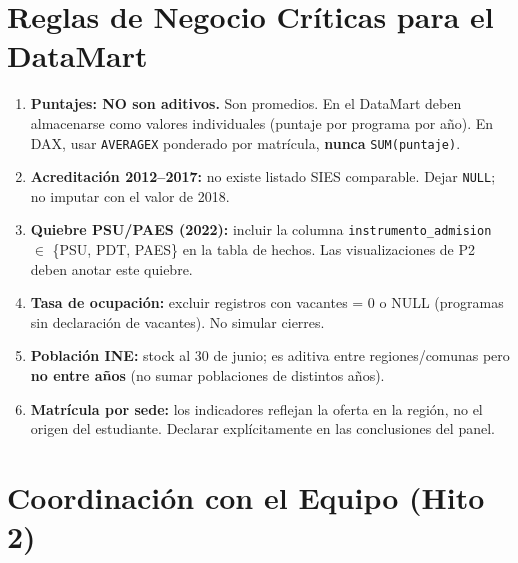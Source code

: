 \documentclass[11pt,a4paper]{article}
\begin{document}
\section{Reglas de Negocio Críticas para el DataMart}
\label{sec:reglas}

\begin{tcolorbox}[colback=white, colframe=warnred,
    title=\textbf{\color{warnred}Advertencias de Integración (Persona 2 $\to$ Personas 3, 4 y 5)}]
\begin{enumerate}[leftmargin=*]
    \item \textbf{Puntajes: NO son aditivos.} Son promedios. En el DataMart
          deben almacenarse como valores individuales (puntaje por programa
          por año). En DAX, usar \texttt{AVERAGEX} ponderado por matrícula,
          \textbf{nunca} \texttt{SUM(puntaje)}.
    \item \textbf{Acreditación 2012--2017:} no existe listado SIES comparable.
          Dejar \texttt{NULL}; no imputar con el valor de 2018.
    \item \textbf{Quiebre PSU/PAES (2022):} incluir la columna
          \texttt{instrumento\_admision} $\in$ \{PSU, PDT, PAES\} en la tabla
          de hechos. Las visualizaciones de P2 deben anotar este quiebre.
    \item \textbf{Tasa de ocupación:} excluir registros con vacantes = 0 o
          NULL (programas sin declaración de vacantes). No simular cierres.
    \item \textbf{Población INE:} stock al 30 de junio; es aditiva entre
          regiones/comunas pero \textbf{no entre años} (no sumar poblaciones
          de distintos años).
    \item \textbf{Matrícula por sede:} los indicadores reflejan la oferta
          en la región, no el origen del estudiante. Declarar explícitamente
          en las conclusiones del panel.
\end{enumerate}
\end{tcolorbox}

\section{Coordinación con el Equipo (Hito 2)}
\label{sec:coordinacion}
\end{document}
